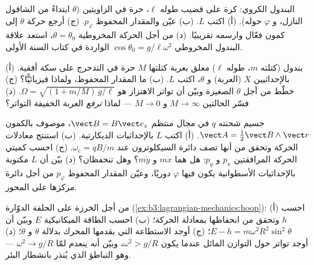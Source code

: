 \begin{exercise}[$\star\star$]\label{exo:b3:lagrangian-mechanics:6}
البندول الكروي: كرة على قضيب طوله $\ell$، حرة في الزاويتين
($\theta$ ابتداءً من الشاقول النازل، و $\varphi$ حوله). (أ) اكتب
$L$. (ب) عيّن  والمقدار المحفوظ $p_\varphi$. (ج)
أرجع حركة $\theta$ إلى كمون فعّال وارسمه تقريبيًا. (د) من أجل
الحركة المخروطية $\theta =
\theta_0$، استعد علاقة البندول المخروطي $\cos\theta_0 =
g/\ell\omega^2$ الواردة في كتاب السنة الأولى.
\end{exercise}

\begin{exercise}[$\star\star$]\label{exo:b3:lagrangian-mechanics:7}
بندول (كتلته $m$، طوله $\ell$) معلق بعربة كتلتها $M$ حرة في
التدحرج على سكة أفقية. (أ) بالإحداثيين $X$ (العربة) و $\theta$،
اكتب $L$. (ب) ما المقدار المحفوظ، ولماذا فيزيائيًّا؟ (ج) خطّط من
أجل $\theta$ الصغيرة وبيّن أن تواتر الاهتزاز هو
$\Omega = \sqrt{(1 + m/M)\,g/\ell}$. (د) فسّر الحالتين $M \to
\infty$ و $M \to 0$ --- لماذا \emph{ترفع} العربة الخفيفة التواتر؟
\end{exercise}

\begin{exercise}[$\star\star$]\label{exo:b3:lagrangian-mechanics:8}
جسيم شحنته $q$ في مجال منتظم $\vect B = B\vect e_z$، موصوف
بالكمون $\vect A = \tfrac12\vect B\wedge\vect r$. (أ) اكتب $L$
بالإحداثيات الديكارتية. (ب) استنتج معادلات الحركة وتحقق من أنها
تصف دائرة السيكلوترون عند $\omega_{\text{c}} = qB/m$. (ج) احسب
كميتي الحركة المرافقتين $p_x$ و $p_y$: هل هما $m\dot x$ و
$m\dot y$؟ وهل تنحفظان؟ (د) بيّن أن $L$ مكتوبة بالإحداثيات
الأسطوانية يكون فيها $\varphi$ دوريًا، وعيّن المقدار المحفوظ
$p_\varphi$ من أجل دائرة مركزها على المحور.
\end{exercise}

\begin{exercise}[$\star\star$]\label{exo:b3:lagrangian-mechanics:9}
من أجل الخرزة على الحلقة الدوّارة
(\cref{ex:b3:lagrangian-mechanics:hoop}): (أ) احسب 
$h$ وتحقق من انحفاظها بمعادلة الحركة؛ (ب) احسب الطاقة الميكانيكية
$E$ وبيّن أن $E - h =
m\omega^2R^2\sin^2\theta$؛ (ج) أوجد الاستطاعة التي يقدمها المحرك
بدلالة $\theta$ و $\dot\theta$؛ (د) أوجد تواتر 
حول التوازن المائل عندما يكون $\omega^2 > g/R$، وبيّن أنه ينعدم
لمّا $\omega^2 \to g/R$ --- وهو التباطؤ الذي يُنذر بانشطار البئر.
\end{exercise}

